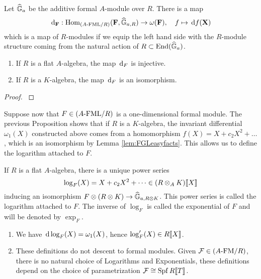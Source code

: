 Let $\widehat{\mathbb{G}}_a$ be the additive formal $A$-module over $R$. There is a map
\begin{equation} \label{eq:functorinvdifftohom}
  \, \mathrm{d}_{\mathbf{F}} : \operatorname{Hom}_{{({A}\text-\mathrm{FML}/{R})}} (\mathbf{F}, \widehat{\mathbb{G}}_{a,R}) \to \omega(\mathbf{F}), \quad f \mapsto \, \mathrm{d} f(\mathbf{X})
\end{equation}
which is a map of $R$-modules if we equip the left hand side with the $R$-module
structure coming from the natural action of $R \subset \operatorname{End}(\widehat{\mathbb{G}}_a)$. 
\begin{prop}\label{prop:loginvdiff}
  \begin{enumerate}
    \item If $R$ is a flat $A$-algebra, the map $\, \mathrm{d}_F$ is injective.
    \item If $R$ is a $K$-algebra, the map $\, \mathrm{d}_F$ is an isomorphism.
  \end{enumerate}
\begin{proof}
  \cite[Proposition 3.2]{hopkins1994equivariant} 
\end{proof}
\end{prop}

Suppose now that $F \in {({A}\text-\mathrm{FML}/{R})}$ is a one-dimensional formal module. 
The previous Proposition shows that if $R$ is a $K$-algebra, the invariant differential 
$\omega_1(X)$ constructed above comes from a homomorphism $f(X) = X + c_2 X^2 + \dots$,
which is an isomorphism by Lemma \ref{lem:FGLeasyfacts}. 
This allows us to define the logarithm attached to $F$.
\begin{defi}
  If $R$ is a flat $A$-algebra, there is a unique power series
  \begin{equation*}
    \log_F(X) = X + c_2 X^2 + \dots \in (R \otimes_A K)\llbracket X \rrbracket 
  \end{equation*}
  inducing an isomorphism $F \otimes (R \otimes K) \to \widehat{\mathbb{G}}_{a,R\otimes K}$.
  This power series is called the logarithm attached to $F$.   The inverse of $\log_F$ is called the exponential of $F$ and will be denoted by
  $\exp_F$.
\end{defi}
\begin{rmk} \leavevmode
  \begin{enumerate}
    \item We have $\, \mathrm{d} \log_F(X) = \omega_1(X)$, hence $\log'_F(X) \in R\llbracket X \rrbracket$. 
    \item These definitions do not descent to formal modules. Given $\mathcal{F} \in {({A}\text-\mathrm{FM}/{R})}$, there is no natural choice of Logarithms and Exponentials, these
  definitions depend on the choice of parametrization
  $\mathcal{F} \cong \operatorname{Spf} R \llbracket T \rrbracket$. 
  \end{enumerate}
  \end{rmk}



